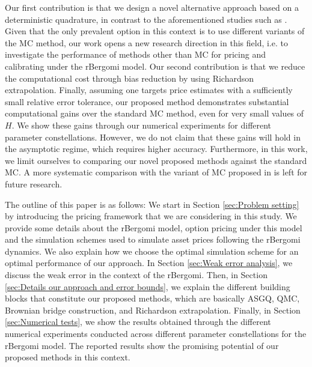 Our first contribution is that we design a novel alternative approach based on a deterministic quadrature, in contrast to the aforementioned studies such as \cite{mccrickerd2018turbocharging}. Given that the only prevalent option in this context is to use different variants of the MC method, our work opens a new  research direction in this field, i.e.  to investigate the performance of methods other than MC for pricing and calibrating under the rBergomi model. Our second contribution is that we reduce the computational cost  through bias reduction by using Richardson extrapolation. Finally, assuming one targets price estimates with a sufficiently small relative error tolerance, our proposed method demonstrates substantial computational gains  over the standard MC method, even for very small values of  $H$. We show  these gains through our numerical experiments for  different parameter constellations. However, we do not claim that these gains will hold in the asymptotic regime, which requires higher accuracy. Furthermore,  in this work, we limit ourselves to comparing our novel proposed methods against the standard MC. A more systematic comparison with the variant of MC proposed in \cite{mccrickerd2018turbocharging} is left for future research. 

The outline of this paper is as follows: We start in Section \ref{sec:Problem setting} by  introducing  the pricing framework that we are considering in this study. We provide some details about the rBergomi model, option pricing under this model and the simulation schemes used to simulate asset prices following the rBergomi dynamics. We also  explain how we choose the optimal simulation scheme for an optimal performance of our approach. In Section \ref{sec:Weak error analysis}, we discuss the weak error in the context of the rBergomi. Then, in Section \ref{sec:Details our approach and error bounds}, we explain the different building blocks that constitute our proposed methods, which are basically ASGQ, QMC, Brownian bridge construction, and Richardson extrapolation. Finally, in Section \ref{sec:Numerical tests}, we show the results obtained through the different numerical experiments conducted across different parameter constellations for the rBergomi model. The reported results show the promising potential of our proposed methods in this context.